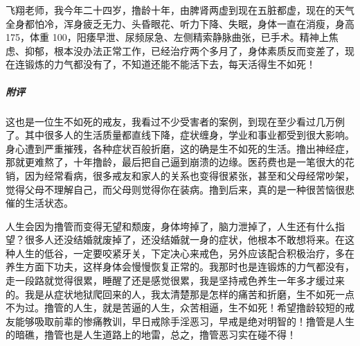 \begin{case}
    飞翔老师，我今年二十四岁，撸龄十年，由脾肾两虚到现在五脏都虚，现在的天气全身都怕冷，浑身疲乏无力、头昏眼花、听力下降、失眠，身体一直在消瘦，身高 175，体重 100，阳痿早泄、尿频尿急、左侧精索静脉曲张，已手术。精神上焦虑、抑郁，根本没办法正常工作，已经治疗两个多月了，身体素质反而变差了，现在连锻炼的力气都没有了，不知道还能不能活下去，每天活得生不如死！
    \subparagraph{附评} 这也是一位生不如死的戒友，我看过不少受害者的案例，到现在至少看过几万例了。其中很多人的生活质量都直线下降，症状缠身，学业和事业都受到很大影响。身心遭到严重摧残，各种症状百般折磨，这的确是生不如死的生活。撸出神经症，那就更难熬了，十年撸龄，最后把自己逼到崩溃的边缘。医药费也是一笔很大的花销，因为经常看病，很多戒友和家人的关系也变得很紧张，甚至和父母经常吵架，觉得父母不理解自己，而父母则觉得你在装病。撸到后来，真的是一种很苦恼很悲催的生活状态。

    人生会因为撸管而变得无望和颓废，身体垮掉了，脑力泄掉了，人生还有什么指望？很多人还没结婚就废掉了，还没结婚就一身的症状，他根本不敢想将来。在这种人生的低谷，一定要咬紧牙关，下定决心来戒色，另外应该配合积极治疗，多在养生方面下功夫，这样身体会慢慢恢复正常的。我那时也是连锻炼的力气都没有，走一段路就觉得很累，睡醒了还是感觉很累，我是坚持戒色养生一年多才缓过来的。我是从症状地狱爬回来的人，我太清楚那是怎样的痛苦和折磨，生不如死一点不为过。撸管的人生，就是苦逼的人生，众苦相逼，生不如死！希望撸龄较短的戒友能够吸取前辈的惨痛教训，早日戒除手淫恶习，早戒是绝对明智的！撸管是人生的暗礁，撸管也是人生道路上的地雷，总之，撸管恶习实在碰不得！
\end{case}


